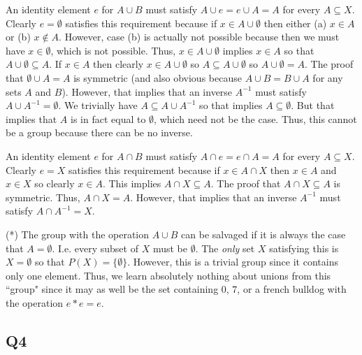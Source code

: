 \documentclass[12pt]{article}
\numberwithin{theorem}{section}
\numberwithin{equation}{section}
\numberwithin{remark}{section}
\numberwithin{definition}{section}
\numberwithin{theorem}{section}
\numberwithin{lemma}{section}
\numberwithin{example}{section}
\begin{document}
An identity element $e$ for $A\cup B$ must satisfy $A\cup e = e \cup A = A$ for every $A\subseteq X$. Clearly $e=\emptyset$ satisfies this requirement because if $x\in A\cup\emptyset$ then either (a) $x\in A$ or (b) $x\notin A$. However, case (b) is actually not possible because then we must have $x\in\emptyset$, which is not possible. Thus, $x\in A\cup\emptyset$ implies $x\in A$ so that $A\cup\emptyset \subseteq A$. If $x\in A$ then clearly $x\in A\cup\emptyset$ so $A\subseteq A\cup\emptyset$ so $A\cup\emptyset = A$. The proof that $\emptyset\cup A = A$ is symmetric (and also obvious because $A\cup B = B \cup A$ for any sets $A$ and $B$). However, that implies that an inverse $A^{-1}$ must satisfy $A\cup A^{-1} = \emptyset$. We trivially have $A\subseteq A \cup A^{-1}$ so that implies $A\subseteq \emptyset$. But that implies that $A$ is in fact equal to $\emptyset$, which need not be the case. Thus, this cannot be a group because there can be no inverse. 

An identity element $e$ for $A\cap B$ must satisfy $A\cap e = e \cap A = A$ for every $A\subseteq X$. Clearly $e=X$ satisfies this requirement because if $x\in A \cap X$ then $x\in A$ and $x\in X$ so clearly $x\in A$. This implies $A \cap X \subseteq A$. The proof that $A \cap X \subseteq A$ is symmetric. Thus, $A \cap X = A$. However, that implies that an inverse $A^{-1}$ must satisfy $A\cap A^{-1} = X$. 

\vspace{\baselineskip}

\noindent (*) The group with the operation $A\cup B$ can be salvaged if it is always the case that $A=\emptyset$. I.e. every subset of $X$ must be $\emptyset$. The \emph{only} set $X$ satisfying this is $X=\emptyset$ so that $P(X)=\{\emptyset\}$. However, this is a trivial group since it contains only one element. Thus, we learn absolutely nothing about unions from this ``group" since it may as well be the set containing $0$, $7$, or a french bulldog with the operation $e*e=e$. 



\subsection{Q4}
\end{document}
